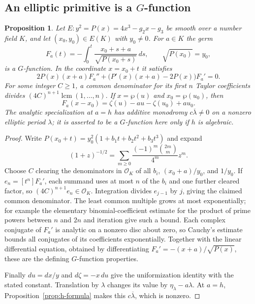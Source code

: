 \documentclass[11pt]{article}
\newtheorem{proposition}[theorem]{Proposition}
\theoremstyle{definition}\newtheorem{definition}[theorem]{Definition}
\theoremstyle{remark}\newtheorem{remark}[theorem]{Remark}
\begin{document}
\subsection{An elliptic primitive is a \texorpdfstring{$G$}{G}-function}
\begin{proposition}\label{prop:elliptic-gfunction}
Let $E:y^2=P(x)=4x^3-g_2x-g_3$ be smooth over a number field $K$, and let $(x_0,y_0)\in E(K)$ with $y_0\ne0$. For $a\in K$ the germ
\[
 F_a(t)=-\int_0^t\frac{x_0+s+a}{\sqrt{P(x_0+s)}}\,ds,
                         \qquad\sqrt{P(x_0)}=y_0,
\]
is a $G$-function. In the coordinate $x=x_0+t$ it satisfies
\[
 2P(x)(x+a)F_a''+
              \bigl(P'(x)(x+a)-2P(x)\bigr)F_a'=0.
\]
For some integer $C\ge1$, a common denominator for its first $n$ Taylor coefficients divides
$(4C)^{n+1}\operatorname{lcm}(1,\ldots,n)$.
If $x=\wp(u)$ and $x_0=\wp(u_0)$, then
\[
 F_a(x-x_0)=\zeta(u)-au-\zeta(u_0)+au_0.
\]
The analytic specialization at $a=h$ has additive monodromy $c\overline\lambda\ne0$ on a nonzero elliptic period $\lambda$; it is asserted to be a $G$-function here only if $h$ is algebraic.
\end{proposition}
\begin{proof}
Write $P(x_0+t)=y_0^2(1+b_1t+b_2t^2+b_3t^3)$ and expand
\[
 (1+z)^{-1/2}=\sum_{m\ge0}\frac{(-1)^m\binom{2m}{m}}{4^m}z^m.
\]
Choose $C$ clearing the denominators in $\mathcal O_K$ of all $b_i$, $(x_0+a)/y_0$, and $1/y_0$. If $e_n=[t^n]F_a'$, each summand uses at most $n$ of the $b_i$ and one further cleared factor, so $(4C)^{n+1}e_n\in\mathcal O_K$. Integration divides $e_{j-1}$ by $j$, giving the claimed common denominator. The least common multiple grows at most exponentially; for example the elementary binomial-coefficient estimate for the product of prime powers between $n$ and $2n$ and iteration give such a bound. Each complex conjugate of $F_a'$ is analytic on a nonzero disc about zero, so Cauchy's estimate bounds all conjugates of its coefficients exponentially. Together with the linear differential equation, obtained by differentiating $F_a'=-(x+a)/\sqrt{P(x)}$, these are the defining $G$-function properties.

Finally $du=dx/y$ and $d\zeta=-x\,du$ give the uniformization identity with the stated constant. Translation by $\lambda$ changes its value by $\eta_\lambda-a\lambda$. At $a=h$, Proposition~\ref{prop:h-formula} makes this $c\overline\lambda$, which is nonzero.
\end{proof}
\end{document}
